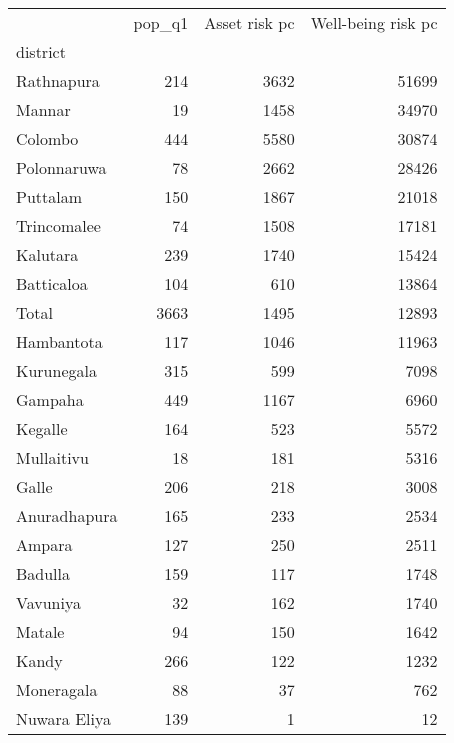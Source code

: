 \begin{tabular}{lrrr}
\toprule
{} &  pop\_q1 &  Asset risk pc &  Well-being risk pc \\
district     &         &                &                     \\
\midrule
Rathnapura   &     214 &           3632 &               51699 \\
Mannar       &      19 &           1458 &               34970 \\
Colombo      &     444 &           5580 &               30874 \\
Polonnaruwa  &      78 &           2662 &               28426 \\
Puttalam     &     150 &           1867 &               21018 \\
Trincomalee  &      74 &           1508 &               17181 \\
Kalutara     &     239 &           1740 &               15424 \\
Batticaloa   &     104 &            610 &               13864 \\
Total        &    3663 &           1495 &               12893 \\
Hambantota   &     117 &           1046 &               11963 \\
Kurunegala   &     315 &            599 &                7098 \\
Gampaha      &     449 &           1167 &                6960 \\
Kegalle      &     164 &            523 &                5572 \\
Mullaitivu   &      18 &            181 &                5316 \\
Galle        &     206 &            218 &                3008 \\
Anuradhapura &     165 &            233 &                2534 \\
Ampara       &     127 &            250 &                2511 \\
Badulla      &     159 &            117 &                1748 \\
Vavuniya     &      32 &            162 &                1740 \\
Matale       &      94 &            150 &                1642 \\
Kandy        &     266 &            122 &                1232 \\
Moneragala   &      88 &             37 &                 762 \\
Nuwara Eliya &     139 &              1 &                  12 \\
\bottomrule
\end{tabular}
